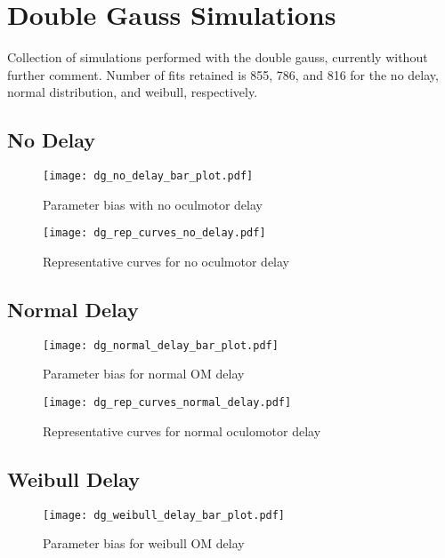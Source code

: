\section*{Double Gauss Simulations}

Collection of simulations performed with the double gauss, currently without further comment. Number of fits retained is 855, 786, and 816 for the no delay, normal distribution, and weibull, respectively.

\subsection{No Delay}


\begin{figure}[H]
\centering
\texttt{[image: dg\_no\_delay\_bar\_plot.pdf]} 
\caption{Parameter bias with no oculmotor delay}
\label{fig:dg_par_bias_no_delay}
\end{figure}

\begin{figure}[H]
\centering
\texttt{[image: dg\_rep\_curves\_no\_delay.pdf]}
\caption{Representative curves for no oculmotor delay}
\label{fig:dg_rep_curves_no_delay}
\end{figure}


\subsection{Normal Delay}


\begin{figure}[H]
\centering
\texttt{[image: dg\_normal\_delay\_bar\_plot.pdf]} 
\caption{Parameter bias for normal OM delay}
\label{fig:dg_par_bias_normal_delay}
\end{figure}

\begin{figure}[H]
\centering
\texttt{[image: dg\_rep\_curves\_normal\_delay.pdf]}
\caption{Representative curves for normal oculomotor delay}
\label{fig:dg_rep_curves_normal_delay}
\end{figure}

\subsection{Weibull Delay}

\begin{figure}[H]
\centering
\texttt{[image: dg\_weibull\_delay\_bar\_plot.pdf]} 
\caption{Parameter bias for weibull OM delay}
\label{fig:dg_par_bias_weibull_delay}
\end{figure}

